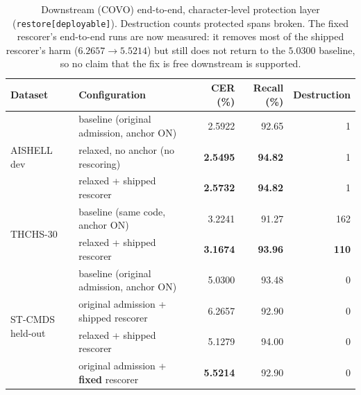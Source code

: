 \begin{table}[t]
\centering
\caption{Downstream (COVO) end-to-end, character-level protection layer
(\texttt{restore[deployable]}). Destruction counts protected spans broken.
The fixed rescorer's end-to-end runs are now measured: it removes most of the
shipped rescorer's harm ($6.2657 \to 5.5214$) but still does not return to the
$5.0300$ baseline, so no claim that the fix is free downstream is supported.}
\label{tab:downstream}
\begin{tabular}{llrrr}
\toprule
Dataset & Configuration & CER (\%) & Recall (\%) & Destruction \\
\midrule
\multirow{3}{*}{AISHELL dev}
  & baseline (original admission, anchor ON) & 2.5922 & 92.65 & 1 \\
  & relaxed, no anchor (no rescoring)        & \textbf{2.5495} & \textbf{94.82} & 1 \\
  & relaxed + shipped rescorer               & \textbf{2.5732} & \textbf{94.82} & 1 \\
\midrule
\multirow{2}{*}{THCHS-30}
  & baseline (same code, anchor ON)          & 3.2241 & 91.27 & 162 \\
  & relaxed + shipped rescorer               & \textbf{3.1674} & \textbf{93.96} & \textbf{110} \\
\midrule
\multirow{4}{*}{ST-CMDS held-out}
  & baseline (original admission, anchor ON) & 5.0300 & 93.48 & 0 \\
  & original admission + shipped rescorer    & 6.2657 & 92.90 & 0 \\
  & relaxed + shipped rescorer               & 5.1279 & 94.00 & 0 \\
  & original admission + \textbf{fixed} rescorer & \textbf{5.5214} & 92.90 & 0 \\
\bottomrule
\end{tabular}
\end{table}

